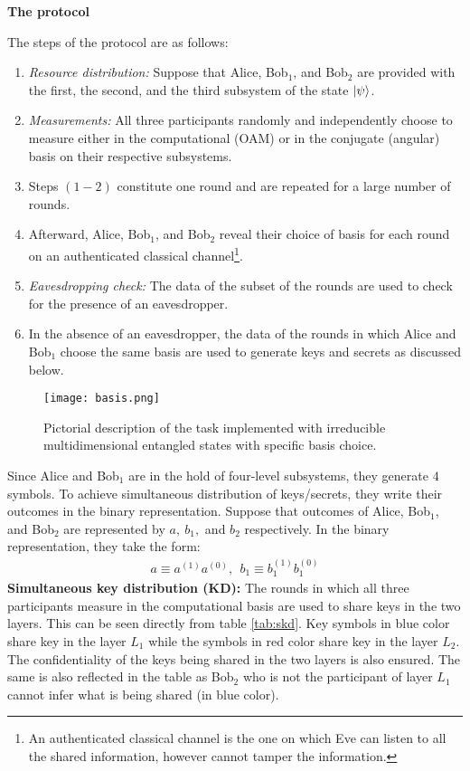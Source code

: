 \documentclass[fleqn,10pt]{wlscirep}
\begin{document}
 \begin{center}
     \textbf{The protocol}
 \end{center}
 The steps of the protocol are as follows:
 \begin{enumerate}
\item \textit{Resource distribution:} Suppose that Alice, Bob$_1$, and Bob$_2$ are provided with the first, the second, and the third subsystem of the state $\ket{\psi}$.
\item \textit{Measurements:} All three participants randomly and independently choose to measure either in the computational (OAM) or in the conjugate (angular) basis on their respective subsystems.
\item Steps $(1-2)$ constitute one round and are repeated for a large number of rounds.
\item Afterward, Alice, Bob$_1$, and Bob$_2$ reveal their choice of basis for each round on an authenticated classical channel\footnote{An authenticated classical channel is the one on which Eve can listen to all the shared information, however cannot tamper the information. }.
\item \textit{Eavesdropping check:} The data of the subset of the rounds are used to check for the presence of an eavesdropper.
\item In the absence of an eavesdropper, the data of the rounds in which Alice and Bob$_1$ choose the same basis are used to generate keys and secrets as discussed below.
   \end{enumerate}
\begin{wrapfigure}{r}{7.1cm}
\centering
    \texttt{[image: basis.png]}
    \caption{Pictorial description of the task implemented with irreducible multidimensional entangled states with specific basis choice.}
    \label{fig:sbd}
\end{wrapfigure} 
Since Alice and Bob$_1$  are in the hold of four-level subsystems, they generate $4$ symbols. To achieve simultaneous distribution of keys/secrets, they write their outcomes in the binary representation. Suppose that outcomes of Alice, Bob$_1$, and Bob$_2$ are represented by $a,~b_1,$ and $b_2$ respectively. In the binary representation, they take the form:
\begin{align}
    a\equiv a^{(1)}a^{(0)},~~b_1\equiv b_1^{(1)}b_1^{(0)}
\end{align}
\noindent\textbf{Simultaneous key distribution (KD):} The rounds in which all three participants measure in the computational basis are used to share keys in the two layers. This can be seen directly from table \ref{tab:skd}. Key symbols in blue color share key in the layer $L_1$ while the symbols in red color share key in the layer $L_2$. The confidentiality of the keys being shared in the two layers is also ensured. The same is also reflected in the table as Bob$_2$ who is not the participant of layer $L_1$ cannot infer what is being shared (in blue color).
\end{document}
